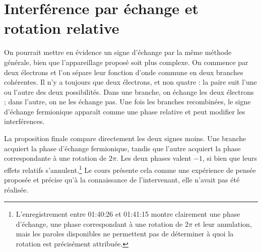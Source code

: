\begin{classroomqa}
\end{classroomqa}

\begin{classroomqa}
\end{classroomqa}

\section{Interférence par échange et rotation relative}

On pourrait mettre en évidence un signe d’échange par la même méthode générale, bien que l’appareillage proposé soit plus complexe. On commence par deux électrons et l’on sépare leur fonction d’onde commune en deux branches cohérentes. Il n’y a toujours que deux électrons, et non quatre : la paire suit l’une ou l’autre des deux possibilités. Dans une branche, on échange les deux électrons ; dans l’autre, on ne les échange pas. Une fois les branches recombinées, le signe d’échange fermionique apparaît comme une phase relative et peut modifier les interférences.

La proposition finale compare directement les deux signes moins. Une branche acquiert la phase d’échange fermionique, tandis que l’autre acquiert la phase correspondante à une rotation de \(2\pi\). Les deux phases valent \(-1\), si bien que leurs effets relatifs s’annulent.\footnote{L’enregistrement entre 01:40:26 et 01:41:15 montre clairement une phase d’échange, une phase correspondant à une rotation de \(2\pi\) et leur annulation, mais les paroles disponibles ne permettent pas de déterminer à quoi la rotation est précisément attribuée.} Le cours présente cela comme une expérience de pensée proposée et précise qu’à la connaissance de l’intervenant, elle n’avait pas été réalisée.

\begin{classroomqa}
\end{classroomqa}

